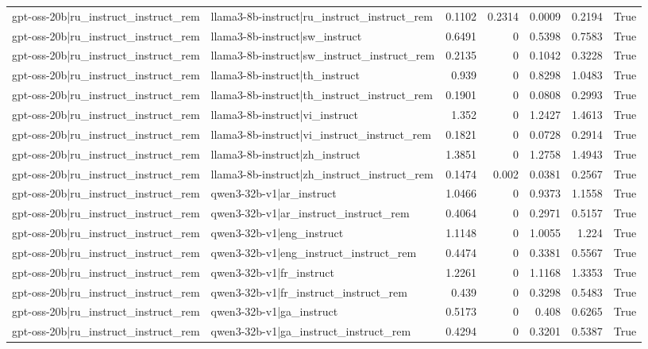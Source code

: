\begin{table}
\begin{tabular}{l l r r r r l}
gpt-oss-20b|ru_instruct_instruct_rem & llama3-8b-instruct|ru_instruct_instruct_rem & 0.1102 & 0.2314 & 0.0009 & 0.2194 & True \\
gpt-oss-20b|ru_instruct_instruct_rem & llama3-8b-instruct|sw_instruct & 0.6491 & 0 & 0.5398 & 0.7583 & True \\
gpt-oss-20b|ru_instruct_instruct_rem & llama3-8b-instruct|sw_instruct_instruct_rem & 0.2135 & 0 & 0.1042 & 0.3228 & True \\
gpt-oss-20b|ru_instruct_instruct_rem & llama3-8b-instruct|th_instruct & 0.939 & 0 & 0.8298 & 1.0483 & True \\
gpt-oss-20b|ru_instruct_instruct_rem & llama3-8b-instruct|th_instruct_instruct_rem & 0.1901 & 0 & 0.0808 & 0.2993 & True \\
gpt-oss-20b|ru_instruct_instruct_rem & llama3-8b-instruct|vi_instruct & 1.352 & 0 & 1.2427 & 1.4613 & True \\
gpt-oss-20b|ru_instruct_instruct_rem & llama3-8b-instruct|vi_instruct_instruct_rem & 0.1821 & 0 & 0.0728 & 0.2914 & True \\
gpt-oss-20b|ru_instruct_instruct_rem & llama3-8b-instruct|zh_instruct & 1.3851 & 0 & 1.2758 & 1.4943 & True \\
gpt-oss-20b|ru_instruct_instruct_rem & llama3-8b-instruct|zh_instruct_instruct_rem & 0.1474 & 0.002 & 0.0381 & 0.2567 & True \\
gpt-oss-20b|ru_instruct_instruct_rem & qwen3-32b-v1|ar_instruct & 1.0466 & 0 & 0.9373 & 1.1558 & True \\
gpt-oss-20b|ru_instruct_instruct_rem & qwen3-32b-v1|ar_instruct_instruct_rem & 0.4064 & 0 & 0.2971 & 0.5157 & True \\
gpt-oss-20b|ru_instruct_instruct_rem & qwen3-32b-v1|eng_instruct & 1.1148 & 0 & 1.0055 & 1.224 & True \\
gpt-oss-20b|ru_instruct_instruct_rem & qwen3-32b-v1|eng_instruct_instruct_rem & 0.4474 & 0 & 0.3381 & 0.5567 & True \\
gpt-oss-20b|ru_instruct_instruct_rem & qwen3-32b-v1|fr_instruct & 1.2261 & 0 & 1.1168 & 1.3353 & True \\
gpt-oss-20b|ru_instruct_instruct_rem & qwen3-32b-v1|fr_instruct_instruct_rem & 0.439 & 0 & 0.3298 & 0.5483 & True \\
gpt-oss-20b|ru_instruct_instruct_rem & qwen3-32b-v1|ga_instruct & 0.5173 & 0 & 0.408 & 0.6265 & True \\
gpt-oss-20b|ru_instruct_instruct_rem & qwen3-32b-v1|ga_instruct_instruct_rem & 0.4294 & 0 & 0.3201 & 0.5387 & True \\

\end{tabular}
\end{table}
